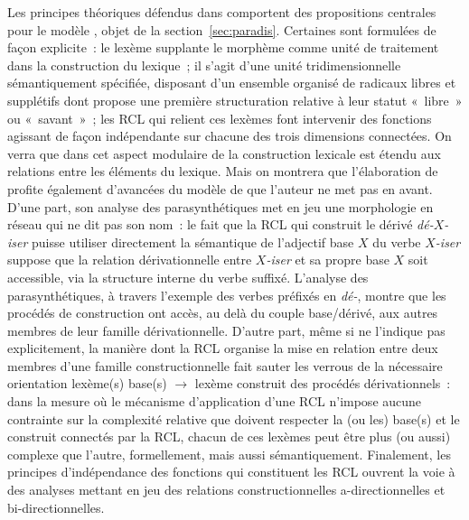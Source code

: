 \documentclass[output=paper]{langsci/langscibook}
\begin{document}
Les principes théoriques défendus dans \citet{Fradin03} comportent des propositions centrales pour le modèle \paradis{}, objet de la section~\ref{sec:paradis}.  Certaines sont formulées de façon explicite~: le lexème supplante le morphème comme unité de traitement dans la construction du lexique~; il s'agit d'une unité tridimensionnelle sémantiquement spécifiée, disposant d'un ensemble organisé de radicaux libres et supplétifs dont \citet[138-140]{Fradin03} propose une première structuration relative à leur statut «~libre~» ou «~savant~»~; les RCL qui relient ces lexèmes font intervenir des fonctions agissant de façon indépendante sur chacune des trois dimensions connectées. On verra que dans \paradis{} cet aspect modulaire de la construction lexicale est étendu aux relations entre les éléments du lexique. Mais on montrera que l'élaboration de \paradis{} profite également d'avancées du modèle de \citet{Fradin03} que l'auteur ne met pas en avant. D'une part, son analyse des parasynthétiques met en jeu une morphologie en réseau qui ne dit pas son nom~: le fait que la RCL qui construit le dérivé \emph{\mbox{dé-$X$-iser}} puisse utiliser directement la sémantique de l'adjectif base $X$ du verbe \emph{\mbox{$X$-iser}} suppose que la relation dérivationnelle entre \emph{\mbox{$X$-iser}} et sa propre base $X$ soit accessible, via la structure interne du verbe suffixé. L'analyse des parasynthétiques, à travers l'exemple des verbes préfixés en \emph{\mbox{dé-}}, montre que les procédés de construction ont accès, au delà du couple base/dérivé, aux autres membres de leur famille dérivationnelle.  D'autre part, même si \citet{Fradin03} ne l'indique pas explicitement, la manière dont la RCL organise la mise en relation entre deux membres d'une famille constructionnelle fait sauter les verrous de la nécessaire orientation lexème(s) base(s) $\rightarrow$ lexème construit des procédés dérivationnels~: dans la mesure où le mécanisme d'application d'une RCL n'impose aucune contrainte sur la complexité relative que doivent respecter la (ou les) base(s) et le construit connectés par la RCL, chacun de ces lexèmes peut être plus (ou aussi) complexe que l'autre,  formellement, mais aussi sémantiquement. Finalement, les principes d'indépendance des fonctions qui constituent les RCL ouvrent la voie à des analyses mettant en jeu des relations constructionnelles a-directionnelles et bi-directionnelles.
\end{document}
